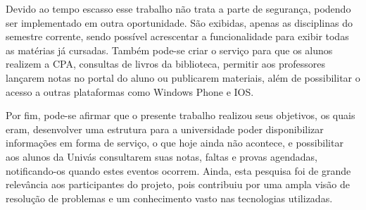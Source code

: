 	\par Devido ao tempo escasso esse trabalho não trata a parte de segurança,
podendo ser implementado em outra oportunidade. São exibidas, apenas as
disciplinas do semestre corrente, sendo possível acrescentar a funcionalidade
para exibir todas as matérias já cursadas. Também pode-se criar o serviço para
que os alunos realizem a CPA, consultas de livros da biblioteca, permitir aos
professores lançarem notas no portal do aluno ou publicarem materiais, além de
possibilitar o acesso a outras plataformas como Windows Phone e IOS.

	\par Por fim, pode-se afirmar que o presente trabalho realizou seus objetivos,
os quais eram, desenvolver uma estrutura para a universidade poder
disponibilizar informações em forma de serviço, o que hoje ainda não acontece,
e possibilitar aos alunos da Univás consultarem suas notas, faltas e provas
agendadas, notificando-os quando estes eventos ocorrem. Ainda, esta
pesquisa foi de grande relevância aos participantes do projeto, pois contribuiu
por uma ampla visão de resolução de problemas e um conhecimento vasto nas
tecnologias utilizadas.
